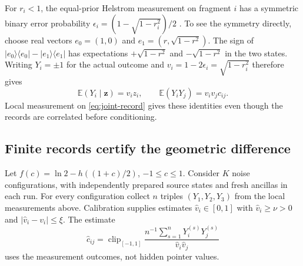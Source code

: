 \documentclass[12pt,a4paper]{article}
\begin{document}
For $r_i<1$, the equal-prior Helstrom measurement on fragment $i$
has a symmetric binary error probability
$\epsilon_i=(1-\sqrt{1-r_i^2})/2$ \cite{Helstrom1976,Liu2026PaperE}.
To see the symmetry directly, choose real vectors
$e_0=(1,0)$ and $e_1=(r,\sqrt{1-r^2})$. The sign of
$|e_0\rangle\langle e_0|-|e_1\rangle\langle e_1|$ has expectations
$+\sqrt{1-r^2}$ and $-\sqrt{1-r^2}$ in the two states.
Writing $Y_i=\pm1$ for the actual outcome and
$v_i=1-2\epsilon_i=\sqrt{1-r_i^2}$ therefore gives
\begin{equation}
\mathbb E(Y_i\mid\mathbf z)=v_i z_i,\qquad
\mathbb E(Y_iY_j)=v_iv_jc_{ij}.
\label{eq:record-correlations}
\end{equation}
Local measurement on \eqref{eq:joint-record} gives these identities
even though the records are correlated before conditioning.

\subsection{Finite records certify the geometric difference}
\label{sec:record-certificate}

Let $f(c)=\ln2-h((1+c)/2)$, $-1\le c\le1$. Consider $K$ noise
configurations, with independently prepared source states and fresh
ancillas in each run. For every configuration collect $n$ triples
$(Y_1,Y_2,Y_3)$ from the local measurements above. Calibration supplies
estimates $\widehat v_i\in[0,1]$ with $\widehat v_i\ge\nu>0$ and
$|\widehat v_i-v_i|\le\xi$. The estimate
\[
\widehat c_{ij}
 =\operatorname{clip}_{[-1,1]}
   \frac{n^{-1}\sum_{s=1}^nY_i^{(s)}Y_j^{(s)}}
        {\widehat v_i\widehat v_j}
\]
uses the measurement outcomes, not hidden pointer values.
\end{document}
